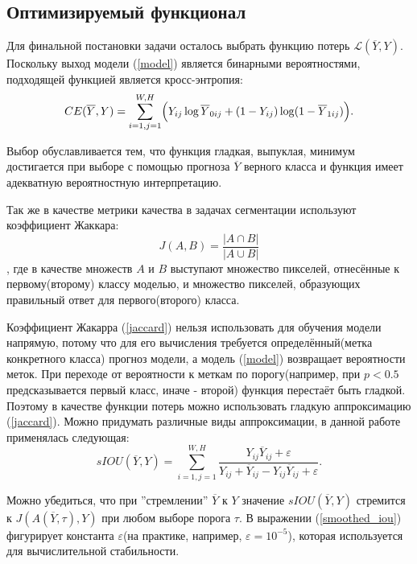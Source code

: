 \documentclass[14pt, a4paper, oneside, bold]{extarticle}
\begin{document}
\subsection{Оптимизируемый функционал}

Для финальной постановки задачи осталось выбрать функцию потерь 
$\mathcal{L}(\overline{Y}, Y)$. Поскольку выход модели (\ref{model})
является бинарными вероятностями, подходящей функцией является кросс-энтропия:
\begin{equation} \label{cross-entropy}
	CE(\overline{Y}, Y) = \sum \limits_{i=1, j=1}^{W, H} \Bigl(
		Y_{ij} \log \overline{Y}_{0ij} 
		+ (1 - Y_{ij}) \log (1 - \overline{Y}_{1ij}) \Bigr).
\end{equation}

Выбор обуславливается тем, что функция гладкая, выпуклая, минимум достигается 
при выборе с помощью прогноза $\overline{Y}$ верного класса и функция 
имеет адекватную вероятностную интерпретацию.

Так же в качестве метрики качества в задачах сегментации используют коэффициент Жаккара: 
\begin{equation} \label{jaccard}
	J(A, B) = \frac{|A \cap B|}{|A \cup B|} 
\end{equation}
, где в качестве множеств $A$ и $B$ выступают множество пикселей, отнесённые к 
первому(второму) классу моделью, и множество пикселей, образующих правильный ответ для первого(второго) класса.

Коэффициент Жакарра (\ref{jaccard}) нельзя использовать для обучения модели напрямую, потому что для его вычисления требуется определённый(метка конкретного класса) прогноз модели, а модель 
(\ref{model}) возвращает вероятности меток. При переходе от вероятности к меткам по порогу(например, при $p<0.5$ предсказывается первый класс, иначе - второй) функция перестаёт быть гладкой. Поэтому в качестве функции потерь можно использовать гладкую аппроксимацию (\ref{jaccard}). Можно придумать различные виды аппроксимации, в данной работе применялась следующая:
\begin{equation} \label{smoothed_iou}
	sIOU(\overline{Y}, Y) = \sum \limits_{i=1, j=1}^{W, H}
		\frac{Y_{ij} \overline{Y}_{ij} + \varepsilon}
		{Y_{ij} + \overline{Y}_{ij} 
			- Y_{ij} \overline{Y}_{ij} + \varepsilon}.
\end{equation} 
 
Можно убедиться, что при ''стремлении'' 
$\overline{Y}$ к $Y$ значение $sIOU(\overline{Y}, Y)$ стремится к $J(A(\overline{Y}, \tau), Y)$ при любом выборе порога $\tau$. В выражении (\ref{smoothed_iou}) фигурирует 
константа $\varepsilon$(на практике, например, $\varepsilon=10^{-5}$), которая используется для вычислительной стабильности.
 
\end{document}
